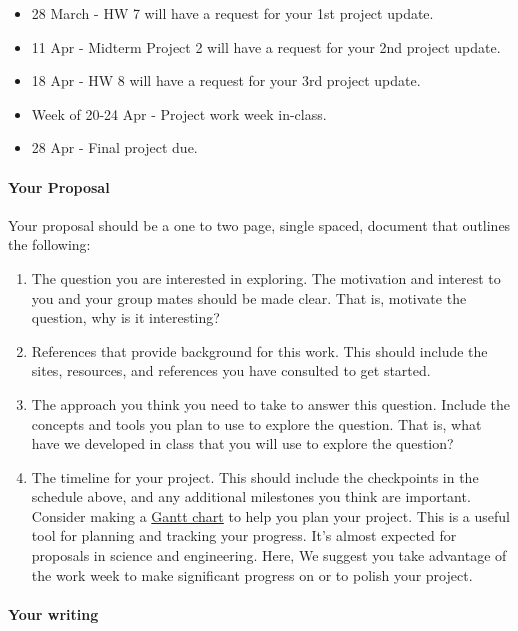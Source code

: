 \documentclass[11pt]{article}
\providecommand{\tightlist}{%
      \setlength{\itemsep}{0pt}\setlength{\parskip}{0pt}}
\begin{document}
\begin{itemize}
\tightlist
\item
  28 March - HW 7 will have a request for your 1st project update.
\item
  11 Apr - Midterm Project 2 will have a request for your 2nd project
  update.
\item
  18 Apr - HW 8 will have a request for your 3rd project update.
\item
  Week of 20-24 Apr - Project work week in-class.
\item
  28 Apr - Final project due.
\end{itemize}

\paragraph{Your Proposal}\label{your-proposal}

Your proposal should be a one to two page, single spaced, document that
outlines the following:

\begin{enumerate}
\def\labelenumi{\arabic{enumi}.}
\tightlist
\item
  The question you are interested in exploring. The motivation and
  interest to you and your group mates should be made clear. That is,
  motivate the question, why is it interesting?
\item
  References that provide background for this work. This should include
  the sites, resources, and references you have consulted to get
  started.
\item
  The approach you think you need to take to answer this question.
  Include the concepts and tools you plan to use to explore the
  question. That is, what have we developed in class that you will use
  to explore the question?
\item
  The timeline for your project. This should include the checkpoints in
  the schedule above, and any additional milestones you think are
  important. Consider making a
  \href{https://en.wikipedia.org/wiki/Gantt_chart}{Gantt chart} to help
  you plan your project. This is a useful tool for planning and tracking
  your progress. It's almost expected for proposals in science and
  engineering. Here, We suggest you take advantage of the work week to
  make significant progress on or to polish your project.
\end{enumerate}

\paragraph{Your writing}\label{your-writing}
\end{document}
